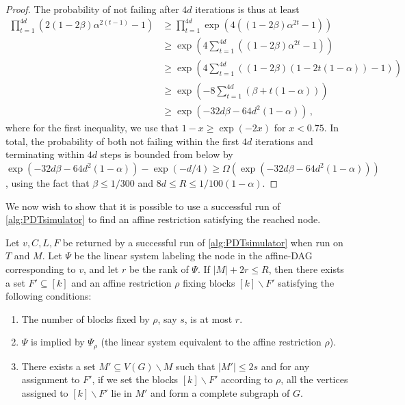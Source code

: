 \documentclass[10pt,a4paper]{article}
\theoremstyle{definition}
\theoremstyle{remark}
\theoremstyle{example}
\theoremstyle{plain}
\renewcommand{\setminus}{\smallsetminus}
\newcommand{\CNbound}{R}
\newcommand{\edgeProbResLin}{\alpha}
\newcommand{\betabound}{1/300}
\newcommand{\rbound}{1/100(1-\edgeProbResLin)}
\begin{document}
{\begin{proof}
    The probability of not failing after $4d$ iterations is thus at least
    \begin{align*}
        \prod_{t=1}^{4d}\left(2(1-2\beta)\edgeProbResLin^{2(t-1)}-1\right)
        &\geq \prod_{t=1}^{4d}\exp(4((1-2\beta)\edgeProbResLin^{2t}-1))\\ 
        &\geq\exp(4\sum_{t=1}^{4d}((1-2\beta)\edgeProbResLin^{2t}-1))\\
        &\geq\exp(4\sum_{t=1}^{4d}((1-2\beta)(1-2t(1-\edgeProbResLin))-1))\\ 
        &\geq \exp(-8\sum_{t=1}^{4d}(\beta+t(1-\edgeProbResLin)))\\
        &\geq \exp(-32d\beta-64d^2(1-\edgeProbResLin)) \,,
    \end{align*}
    where for the first inequality, we use that $1-x \geq \exp(-2x)$ for $x<0.75$. In total, the probability of both not failing within the first $4d$ iterations and terminating within $4d$ steps is bounded from below by $\exp(-32d\beta-64d^2(1-\edgeProbResLin))-\exp(-d/4)\geq \Omega(\exp(-32d\beta-64d^2(1-\edgeProbResLin)))$, using the fact that $\beta \leq \betabound$ and $8d\leq\CNbound\leq\rbound$.
    \end{proof}
}



We now wish to show that it is possible to use a successful run of \autoref{alg:PDTsimulator} to find an affine restriction satisfying the reached node. 

\begin{lemma}
    \label{lemma:assignment-extraction}
    Let $v,C,L,F$ be returned by a successful run of \autoref{alg:PDTsimulator} when run on $T$ and $M$. Let $\Psi$ be the linear system labeling the node in the affine-DAG corresponding to $v$, and let $r$ be the rank of $\Psi$. If $|M|+2r\leq \CNbound $, then there exists a set $F'\subseteq [k]$ and an affine restriction $\rho$ fixing blocks $[k]\setminus F'$ satisfying the following conditions:
    \begin{enumerate}
        \item The number of blocks fixed by $\rho$, say $s$, is at most $r$.
        \item $\Psi$ is implied by $\Psi_\rho$ (the linear system equivalent to the affine restriction $\rho$).
        \item There exists a set $M'\subseteq V(G)\setminus M$ such that  $|M'|\leq 2s$ and for any assignment to $F'$, if we set the blocks $[k]\setminus F'$ according to $\rho$, all the vertices assigned to $[k]\setminus F'$ lie in $M'$ and form a complete subgraph of $G$.
    \end{enumerate}
\end{lemma}
\end{document}
